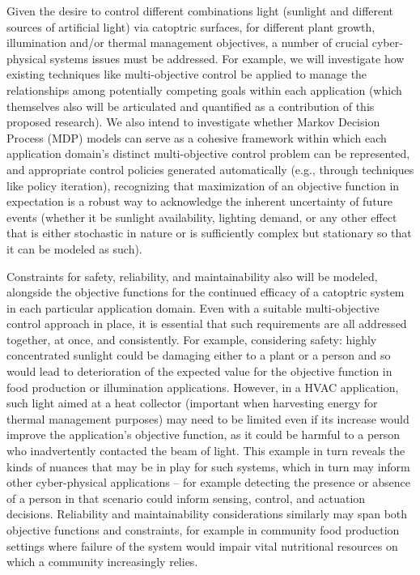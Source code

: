 Given the desire to control different combinations light (sunlight and
different sources of artificial light) via catoptric surfaces, for different
plant growth, illumination and/or thermal management objectives, a number of
crucial cyber-physical systems issues must be addressed.  For example, we will
investigate how existing techniques like multi-objective control be applied to
manage the relationships among potentially competing goals within each
application (which themselves also will be articulated and quantified as a
contribution of this proposed research). We also intend to investigate whether
Markov Decision Process (MDP) models can serve as a cohesive framework within
which each application domain's distinct multi-objective control problem can be
represented, and appropriate control policies generated automatically (e.g.,
through techniques like policy iteration), recognizing that maximization of an
objective function in expectation is a robust way to acknowledge the inherent
uncertainty of future events (whether it be sunlight availability, lighting
demand, or any other effect that is either stochastic in nature or is
sufficiently complex but stationary so that it can be modeled as such).

Constraints for safety, reliability, and maintainability also will be modeled,
alongside the objective functions for the continued efficacy of a catoptric
system in each particular application domain.  Even with a suitable
multi-objective control approach in place, it is essential that such
requirements are all addressed together, at once, and consistently. For
example, considering safety: highly concentrated sunlight could be damaging
either to a plant or a person and so would lead to deterioration of the
expected value for the objective function in food production or illumination
applications.  However, in a HVAC application, such light aimed at a heat
collector (important when harvesting energy for thermal management purposes)
may need to be limited even if its increase would improve the application's
objective function, as it could be harmful to a person who inadvertently
contacted the beam of light.  This example in turn reveals the kinds of nuances
that may be in play for such systems, which in turn may inform other
cyber-physical applications -- for example detecting the presence or absence of
a person in that scenario could inform sensing, control, and actuation
decisions.  Reliability and maintainability considerations similarly may span
both objective functions and constraints, for example in community food
production settings where failure of the system would impair vital nutritional
resources on which a community increasingly relies.

